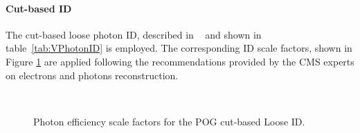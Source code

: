 \paragraph{Cut-based ID}
The cut-based loose photon ID, described in ~\cite{CMS:EGM-17-001} and shown in table~\ref{tab:VPhotonID} is employed.
The corresponding ID scale factors, shown in Figure \ref{fig:phEffSF} are applied following the recommendations provided by the CMS experts on electrons and photons reconstruction.

\begin{figure}
\\
\caption{Photon efficiency scale factors for the POG cut-based Loose ID.}
\label{fig:phEffSF}
\end{figure}

